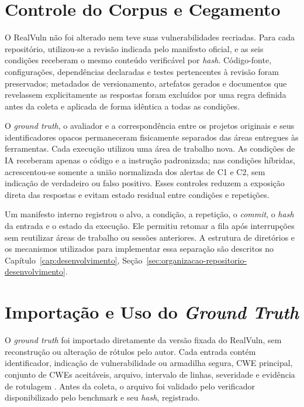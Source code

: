 \section{Controle do Corpus e Cegamento}\label{sec:repositorio-experimental}

O RealVuln não foi alterado nem teve suas vulnerabilidades recriadas. Para cada repositório, utilizou-se a revisão indicada pelo manifesto oficial, e as seis condições receberam o mesmo conteúdo verificável por \textit{hash}. Código-fonte, configurações, dependências declaradas e testes pertencentes à revisão foram preservados; metadados de versionamento, artefatos gerados e documentos que revelassem explicitamente as respostas foram excluídos por uma regra definida antes da coleta e aplicada de forma idêntica a todas as condições.

O \textit{ground truth}, o avaliador e a correspondência entre os projetos originais e seus identificadores opacos permaneceram fisicamente separados das áreas entregues às ferramentas. Cada execução utilizou uma área de trabalho nova. As condições de IA receberam apenas o código e a instrução padronizada; nas condições híbridas, acrescentou-se somente a união normalizada dos alertas de C1 e C2, sem indicação de verdadeiro ou falso positivo. Esses controles reduzem a exposição direta das respostas e evitam estado residual entre condições e repetições.

Um manifesto interno registrou o alvo, a condição, a repetição, o \textit{commit}, o \textit{hash} da entrada e o estado da execução. Ele permitiu retomar a fila após interrupções sem reutilizar áreas de trabalho ou sessões anteriores. A estrutura de diretórios e os mecanismos utilizados para implementar essa separação são descritos no Capítulo~\ref{cap:desenvolvimento}, Seção~\ref{sec:organizacao-repositorio-desenvolvimento}.

\section{Importação e Uso do \textit{Ground Truth}}\label{sec:ground-truth-metodologia}

O \textit{ground truth} foi importado diretamente da versão fixada do RealVuln, sem reconstrução ou alteração de rótulos pelo autor. Cada entrada contém identificador, indicação de vulnerabilidade ou armadilha segura, CWE principal, conjunto de CWEs aceitáveis, arquivo, intervalo de linhas, severidade e evidência de rotulagem \cite{Pellew2026RealVuln}. Antes da coleta, o arquivo foi validado pelo verificador disponibilizado pelo benchmark e seu \textit{hash}, registrado.

